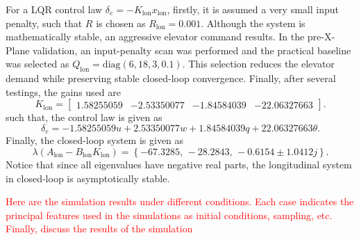 \documentclass[10pt]{article}
\begin{document}
For a LQR control law $\delta_e=-K_{\mathrm{lon}}x_{\mathrm{lon}}$, firstly, it is assumed a very small input penalty, such that $R$ is chosen as $R_{\mathrm{lon}}=0.001$. Although the system is mathematically stable, an aggressive elevator command results.
In the pre-X-Plane validation,
an input-penalty scan was performed and the practical baseline was
selected as $Q_{\mathrm{lon}}=\mathrm{diag}(6,18,3,0.1)$. 
This selection reduces the elevator demand while preserving stable
closed-loop convergence. Finally, after several testings, the gains used are
\begin{equation}
    K_{\mathrm{lon}} =
    \begin{bmatrix}
        1.58255059 & -2.53350077 & -1.84584039 & -22.06327663
    \end{bmatrix}.
\end{equation}
such that, the control law is given as
\begin{equation}
    \delta_e =
    -1.58255059u
    +2.53350077w
    +1.84584039q
    +22.06327663\theta.
\end{equation}
Finally, the closed-loop system is given as
\begin{equation}
    \lambda(A_{\mathrm{lon}}-B_{\mathrm{lon}}K_{\mathrm{lon}})
    =
    \left\{
    -67.3285,\,
    -28.2843,\,
    -0.6154 \pm 1.0412j
    \right\}.
\end{equation}
Notice that since all eigenvalues have negative real parts, the longitudinal system in closed-loop is asymptotically stable.

\textcolor{red}{Here are the simulation results under different conditions. Each case indicates the principal features used in the simulations as initial conditions, sampling, etc. Finally, discuss the results of the simulation}
\end{document}
